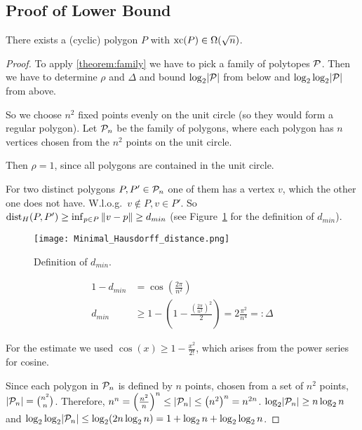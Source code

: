 \subsection{Proof of Lower Bound}

\begin{corollary}\label{corollary:lower-bound}
  There exists a (cyclic) polygon $P$ with $\xc(P) \in \Omega(\sqrt{n})$.
\end{corollary}
\begin{proof}
  To apply \ref{theorem:family} we have to pick a family of polytopes $\P$. Then we have to determine $\rho$ and $\Delta$ and bound $\log_2 \abs{\P}$ from below and $\log_2 \log_2 \abs{\P}$ from above.

  So we choose $n^2$ fixed points evenly on the unit circle (so they would form a regular polygon). Let $\P_n$ be the family of polygons, where each polygon has $n$ vertices chosen from the $n^2$ points on the unit circle.

  Then $\rho = 1$, since all polygons are contained in the unit circle.

  For two distinct polygons $P, P' \in \P_n$ one of them has a vertex $v$, which the other one does not have. W.l.o.g.\ $v \notin P, v \in P'$. So $\dist_H(P,P') \geq \inf_{p \in P} \norm{v-p} \geq d_{min}$ (see Figure~\ref{fig:distance} for the definition of $d_{min}$).

  \begin{figure}[ht]
    \centering
    \texttt{[image: Minimal\_Hausdorff\_distance.png]}
    \caption{Definition of $d_{min}$.}
    \label{fig:distance}
  \end{figure}

  \begin{align*}
    1 - d_{min} & = \cos\left( \frac{2 \pi}{n^2} \right)                                                                \\
    d_{min}     & \geq 1 - \left(1 - \frac{\left(\frac{2 \pi}{n^2}\right)^2}{2} \right) = 2 \frac{\pi^2}{n^4} =: \Delta
  \end{align*}

  For the estimate we used $\cos(x) \geq 1 - \frac{x^2}{2!}$, which arises from the power series for cosine.

  Since each polygon in $\P_n$ is defined by $n$ points, chosen from a set of $n^2$ points, $\abs{\P_n} = \binom{n^2}{n}$. Therefore, $n^n = \left( \frac{n^2}{n} \right)^n \leq \abs{\P_n} \leq \left( n^2 \right)^n = n^{2n}$. $\log_2 \abs{\P_n} \geq n \log_2 n$ and $\log_2 \log_2 \abs{\P_n} \leq \log_2 (2n \log_2 n) = 1 + \log_2 n + \log_2 \log_2 n$.


\end{proof}
